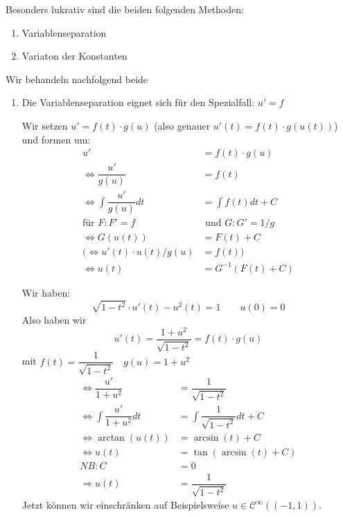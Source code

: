 \documentclass[main.tex]{subfiles}
\begin{document}
Besonders lukrativ sind die beiden folgenden Methoden:
\begin{enumerate}
  \item Variablenseparation
  \item Variaton der Konstanten
\end{enumerate}

Wir behandeln nachfolgend beide

\begin{enumerate}
  \item Die Variablenseparation eignet sich für den Spezialfall: $u' = f$

    Wir setzen $u' = f(t) \cdot g(u)$ (also genauer $u'(t) = f(t) \cdot g(u(t))$) und formen um:
    $$  \begin{aligned}
      u' & = f(t) \cdot g(u) \\
      \Leftrightarrow \dfrac{u'}{g(u)} & = f(t) \\
      \Leftrightarrow \int \dfrac{u'}{g(u)} dt & = \int f(t) dt + C\\
      \text{für $F: F' = f$} & \text{ und $G: G' = 1/g$} \\
      \Leftrightarrow G(u(t)) & = F(t) + C \\
      (\Leftrightarrow u'(t) \cdot u(t)/g(u) & = f(t)) \\
      \Leftrightarrow u(t) & = G^{-1}(F(t) + C)
    \end{aligned}$$

    \begin{Beispiel}[15.26 im Skript]
      Wir haben:
      $$\sqrt{1 - t^2} \cdot u'(t) - u^2(t) = 1 \qquad u(0) = 0$$
      Also haben wir
      $$u'(t) = \dfrac{1 + u^2}{\sqrt{1 -t^2}} = f(t)\cdot g(u)$$
      mit $f(t) = \dfrac{1}{\sqrt{1 -t^2}} \quad g(u) = 1 + u^2$
      $$\begin{aligned}
        \Leftrightarrow \dfrac{u'}{1 + u^2} & = \dfrac{1}{\sqrt{1 -t^2}} \\
        \Leftrightarrow \int \dfrac{u'}{1 + u^2} dt & = \int \dfrac{1}{\sqrt{1 -t^2}} dt + C\\
        \Leftrightarrow \arctan(u(t)) & = \arcsin(t) + C \\
        \Leftrightarrow u(t) & = \tan(\arcsin(t) + C) \\
        NB: C & = 0 \\
        \Rightarrow u(t) & = \dfrac{1}{\sqrt{1 - t^2}}
      \end{aligned}$$
      Jetzt können wir einschränken auf Beispielsweise $u \in \mathcal{C}^\infty((-1,1))$.
    \end{Beispiel}


\end{enumerate}
\end{document}
